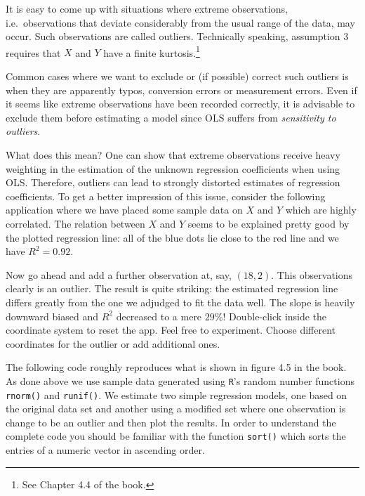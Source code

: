 \documentclass[]{book}
\let\rmarkdownfootnote\footnote%
\def\footnote{\protect\rmarkdownfootnote}
\theoremstyle{definition}
\theoremstyle{definition}
\theoremstyle{definition}
\theoremstyle{remark}
\begin{document}
It is easy to come up with situations where extreme observations,
i.e.~observations that deviate considerably from the usual range of the
data, may occur. Such observations are called outliers. Technically
speaking, assumption 3 requires that \(X\) and \(Y\) have a finite
kurtosis.\footnote{See Chapter 4.4 of the book.}

Common cases where we want to exclude or (if possible) correct such
outliers is when they are apparently typos, conversion errors or
measurement errors. Even if it seems like extreme observations have been
recorded correctly, it is advisable to exclude them before estimating a
model since OLS suffers from \emph{sensitivity to outliers}.

What does this mean? One can show that extreme observations receive
heavy weighting in the estimation of the unknown regression coefficients
when using OLS. Therefore, outliers can lead to strongly distorted
estimates of regression coefficients. To get a better impression of this
issue, consider the following application where we have placed some
sample data on \(X\) and \(Y\) which are highly correlated. The relation
between \(X\) and \(Y\) seems to be explained pretty good by the plotted
regression line: all of the blue dots lie close to the red line and we
have \(R^2=0.92\).

Now go ahead and add a further observation at, say, \((18,2)\). This
observations clearly is an outlier. The result is quite striking: the
estimated regression line differs greatly from the one we adjudged to
fit the data well. The slope is heavily downward biased and \(R^2\)
decreased to a mere \(29\%\)! Double-click inside the coordinate system
to reset the app. Feel free to experiment. Choose different coordinates
for the outlier or add additional ones.

The following code roughly reproduces what is shown in figure 4.5 in the
book. As done above we use sample data generated using \texttt{R}'s
random number functions \texttt{rnorm()} and \texttt{runif()}. We
estimate two simple regression models, one based on the original data
set and another using a modified set where one observation is change to
be an outlier and then plot the results. In order to understand the
complete code you should be familiar with the function \texttt{sort()}
which sorts the entries of a numeric vector in ascending order.
\end{document}
